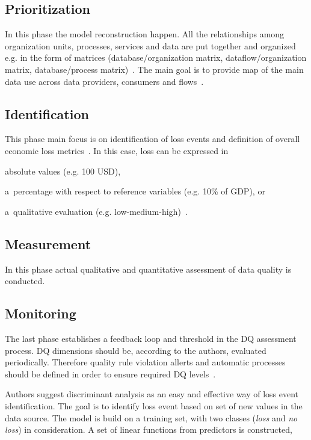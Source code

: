\subsection{Prioritization}

In this phase the model reconstruction happen.
All the relationships among organization units, processes, services and data are put together and organized e.g. in the form of matrices (database/organization matrix, dataflow/organization matrix, database/process matrix)~\cite{batini2007}.
The main goal is to provide map of the main data use across data providers, consumers and flows~\cite{batini2007}.

\subsection{Identification}

This phase main focus is on identification of loss events and definition of overall economic loss metrics~\cite{batini2007}.
In this case, loss can be expressed in 
\begin{enumerate*}[label=(\roman*)]
    \item absolute values (e.g. 100 USD),
    \item a~percentage with respect to reference variables (e.g. 10\% of GDP), or
    \item a~qualitative evaluation (e.g. low-medium-high)~\cite{batini2007}.
\end{enumerate*}

\subsection{Measurement}

In this phase actual qualitative and quantitative assessment of data quality is conducted.

\subsection{Monitoring}

The last phase establishes a feedback loop and threshold in the DQ assessment process.
DQ dimensions should be, according to the authors, evaluated periodically.
Therefore quality rule violation allerts and automatic processes should be defined in order to ensure required DQ levels~\cite{batini2007}.

Authors suggest discriminant analysis as an easy and effective way of loss event identification.
The goal is to identify loss event based on set of new values in the data source.
The model is build on a training set, with two classes (\textit{loss} and \textit{no loss}) in consideration.
A set of linear functions from predictors is constructed,

